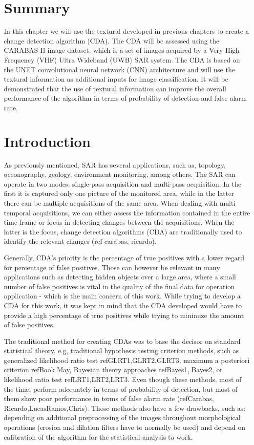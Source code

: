 \section{Summary}
In this chapter we will use the textural developed in previous chapters 
to create a change detection algorithm (CDA). The CDA will be assessed
using the CARABAS-II image dataset, which is a set of images acquired by a Very High Frequency (VHF) Ultra Wideband (UWB) SAR system.
The CDA is based on the UNET convolutional neural network (CNN) architecture and will use the 
textural information as additional inputs for image classification.
It will be demonstrated that the 
use of textural information can improve the overall performance of the algorithm
in terms of probability of detection and false alarm rate. 

\section{Introduction}
As previously mentioned, SAR has several applications, such as, topology, oceonography, geology, environment monitoring, among others.
The SAR can operate in two modes: single-pass acquisition and multi-pass acquisition. In the first it is captured only one picture of the 
monitored area, while in the latter there can be multiple acquisitions of the same area. 
When dealing with multi-temporal acquisitions, we can either assess the information contained in the entire time frame or focus in detecting changes between the acquisitions. 
When the latter is the focus, change detection algorithms (CDA) are traditionally used to identify the relevant changes (ref carabas, ricardo).

Generally, CDA's priority is the percentage of true positives with a lower regard for percentage of false positives. 
Those can however be relevant in many applications such as detecting hidden objects over a large area, 
where a small number of false positives is vital in the quality of the final data for operation application - which is the main concern of this work. 
While trying to develop a CDA for this work, it was kept in mind that the CDA developed would have to provide a high percentage of true positives while trying to minimize
the amount of false positives.

The traditional method for creating CDAs was to base the decisor on standard statistical theory, e.g, traditional hypothesis testing criterion methods,
such as 
generalized likelihood ratio test ref{GLRT1,GLRT2,GLRT3}, 
maximum a posteriori criterion ref{Book May},
Bayesian theory approaches ref{Bayes1, Bayes2},
or likelihood ratio test ref{LRT1,LRT2,LRT3}. Even though these methods, most of the time, perform adequately in terms of probability of detection, but
most of them show poor performance in terms of false alarm rate (ref{Carabas, Ricardo,LucasRamos,Chris}). Those methods also have a few drawbacks, such as: depending on
additional preprocessing of the images throughout morphological operations (erosion and dilation filters have to normally be used) and depend on calibration of the algorithm
for the statistical analysis to work.

